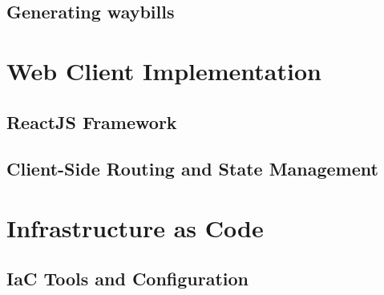\subsection{Generating waybills}

\section{Web Client Implementation}
\label{sec:web-client-implementation}

\subsection{ReactJS Framework}
\label{subsec:reactjs-framework}

\subsection{Client-Side Routing and State Management}
\label{subsec:client-side-routing-state}

\section{Infrastructure as Code}
\label{sec:infrastructure-as-code}

\subsection{IaC Tools and Configuration}
\label{subsec:iac-tools-configuration}

